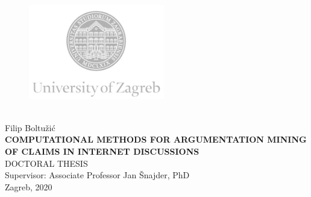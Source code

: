 \begin{titlepage}
  \fontsize{16pt}{20pt}\selectfont
  \selectfont
  \setlength{\intextsep}{0pt plus 0pt minus 0pt}

  \begin{center}
    \begin{figure}[ht!]
      \begin{center}
        \includegraphics[height=4.1184cm, width=5.94cm]{logo_unizg_eng}
      \end{center}
    \end{figure}		
    \vspace{0cm}
    {} \\
    \vspace{3cm}
    Filip Boltužić \\
    \vspace{2cm}
    {\fontsize{22pt}{22pt}\selectfont\textbf{
COMPUTATIONAL METHODS FOR ARGUMENTATION MINING OF CLAIMS IN INTERNET DISCUSSIONS}} \\
    \vspace{2cm}   
    DOCTORAL THESIS \\  
    \vspace{5cm}   %
    Supervisor: Associate Professor Jan Šnajder, PhD \\
    \vfill{Zagreb, 2020}
  \end{center}
  \restoregeometry
\end{titlepage}

